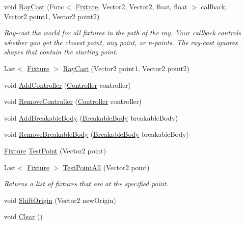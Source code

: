 \begin{DoxyCompactItemize}
void \hyperlink{class_farseer_physics_1_1_dynamics_1_1_world_a873cee4b0920bda96cc5995e128f2c5f}{Ray\+Cast} (Func$<$ \hyperlink{class_farseer_physics_1_1_dynamics_1_1_fixture}{Fixture}, Vector2, Vector2, float, float $>$ callback, Vector2 point1, Vector2 point2)
\begin{DoxyCompactList}\small\item\em Ray-\/cast the world for all fixtures in the path of the ray. Your callback controls whether you get the closest point, any point, or n-\/points. The ray-\/cast ignores shapes that contain the starting point. \end{DoxyCompactList}\item 
List$<$ \hyperlink{class_farseer_physics_1_1_dynamics_1_1_fixture}{Fixture} $>$ \hyperlink{class_farseer_physics_1_1_dynamics_1_1_world_acc988b79bdf8f5a1d0c5bc1166737964}{Ray\+Cast} (Vector2 point1, Vector2 point2)
\item 
void \hyperlink{class_farseer_physics_1_1_dynamics_1_1_world_acfa178fee4a3bdebb5e49a06b76ed49d}{Add\+Controller} (\hyperlink{class_farseer_physics_1_1_controllers_1_1_controller}{Controller} controller)
\item 
void \hyperlink{class_farseer_physics_1_1_dynamics_1_1_world_a7ce3dc6e96d6ecc2df9563cc51859b53}{Remove\+Controller} (\hyperlink{class_farseer_physics_1_1_controllers_1_1_controller}{Controller} controller)
\item 
void \hyperlink{class_farseer_physics_1_1_dynamics_1_1_world_a8e71b7e851d9741eefc320156f49ac00}{Add\+Breakable\+Body} (\hyperlink{class_farseer_physics_1_1_dynamics_1_1_breakable_body}{Breakable\+Body} breakable\+Body)
\item 
void \hyperlink{class_farseer_physics_1_1_dynamics_1_1_world_a29d5487d60be2e44465b7a62b8d10e2f}{Remove\+Breakable\+Body} (\hyperlink{class_farseer_physics_1_1_dynamics_1_1_breakable_body}{Breakable\+Body} breakable\+Body)
\item 
\hyperlink{class_farseer_physics_1_1_dynamics_1_1_fixture}{Fixture} \hyperlink{class_farseer_physics_1_1_dynamics_1_1_world_a529ece73c739eb95797a40ee6bc3dd47}{Test\+Point} (Vector2 point)
\item 
List$<$ \hyperlink{class_farseer_physics_1_1_dynamics_1_1_fixture}{Fixture} $>$ \hyperlink{class_farseer_physics_1_1_dynamics_1_1_world_afcd95f6c9f93169b576ffccde811c4eb}{Test\+Point\+All} (Vector2 point)
\begin{DoxyCompactList}\small\item\em Returns a list of fixtures that are at the specified point. \end{DoxyCompactList}\item 
void \hyperlink{class_farseer_physics_1_1_dynamics_1_1_world_a1e94e2d25c919d233cbfcd622158099f}{Shift\+Origin} (Vector2 new\+Origin)
\item 
void \hyperlink{class_farseer_physics_1_1_dynamics_1_1_world_ade373863bd3d3988c0d5a59ceaf566fb}{Clear} ()
\end{DoxyCompactItemize}
